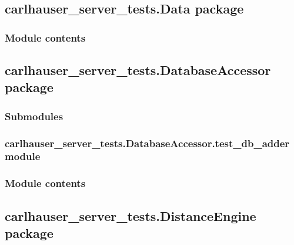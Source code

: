 \documentclass[letterpaper,10pt,english]{sphinxmanual}
\begin{document}
\subsection{carlhauser\_server\_tests.Data package}
\label{\detokenize{carlhauser_server_tests.Data:carlhauser-server-tests-data-package}}\label{\detokenize{carlhauser_server_tests.Data::doc}}

\subsubsection{Module contents}
\label{\detokenize{carlhauser_server_tests.Data:module-carlhauser_server_tests.Data}}\label{\detokenize{carlhauser_server_tests.Data:module-contents}}

\subsection{carlhauser\_server\_tests.DatabaseAccessor package}
\label{\detokenize{carlhauser_server_tests.DatabaseAccessor:carlhauser-server-tests-databaseaccessor-package}}\label{\detokenize{carlhauser_server_tests.DatabaseAccessor::doc}}

\subsubsection{Submodules}
\label{\detokenize{carlhauser_server_tests.DatabaseAccessor:submodules}}

\subsubsection{carlhauser\_server\_tests.DatabaseAccessor.test\_db\_adder module}
\label{\detokenize{carlhauser_server_tests.DatabaseAccessor:carlhauser-server-tests-databaseaccessor-test-db-adder-module}}

\subsubsection{Module contents}
\label{\detokenize{carlhauser_server_tests.DatabaseAccessor:module-carlhauser_server_tests.DatabaseAccessor}}\label{\detokenize{carlhauser_server_tests.DatabaseAccessor:module-contents}}

\subsection{carlhauser\_server\_tests.DistanceEngine package}
\label{\detokenize{carlhauser_server_tests.DistanceEngine:carlhauser-server-tests-distanceengine-package}}\label{\detokenize{carlhauser_server_tests.DistanceEngine::doc}}
\end{document}
